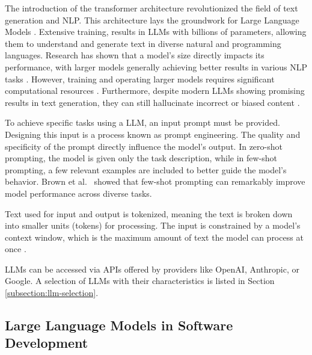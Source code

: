 The introduction of the transformer architecture revolutionized the field of text generation and \ac{NLP}. This architecture lays the groundwork for Large Language Models \cite{changSurveyEvaluationLarge2024, naveedComprehensiveOverviewLarge2024}. Extensive training, results in \acp{LLM} with billions of parameters, allowing them to understand and generate text in diverse natural and programming languages. Research has shown that a model's size directly impacts its performance, with larger models generally achieving better results in various \ac{NLP} tasks \cite{kaplanScalingLawsNeural2020}. However, training and operating larger models requires significant computational resources \cite{LLMsWhatsLarge, naveedComprehensiveOverviewLarge2024}. Furthermore, despite modern \acp{LLM} showing promising results in text generation, they can still hallucinate incorrect or biased content \cite{LLMsWhatsLarge}.

To achieve specific tasks using a \ac{LLM}, an input prompt must be provided. Designing this input is a process known as prompt engineering. The quality and specificity of the prompt directly influence the model's output. In zero-shot prompting, the model is given only the task description, while in few-shot prompting, a few relevant examples are included to better guide the model's behavior. Brown et al.~\cite{brownLanguageModelsAre2020} showed that few-shot prompting can remarkably improve model performance across diverse tasks.

Text used for input and output is tokenized, meaning the text is broken down into smaller units (tokens) for processing. The input is constrained by a model's context window, which is the maximum amount of text the model can process at once \cite{naveedComprehensiveOverviewLarge2024}.

\acp{LLM} can be accessed via APIs offered by providers like OpenAI, Anthropic, or Google. A selection of \acp{LLM} with their characteristics is listed in Section \ref{subsection:llm-selection}.

\subsection{Large Language Models in Software Development}

